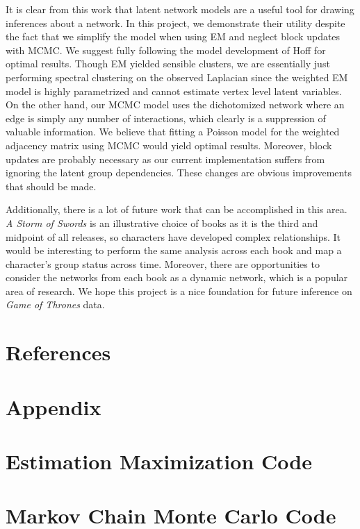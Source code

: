 \documentclass{article}
\begin{document}
It is clear from this work that latent network models are a useful tool for drawing inferences about a network. In this project, we demonstrate their utility despite the fact that we simplify the model when using EM and neglect block updates with MCMC. We suggest fully following the model development of Hoff for optimal results. Though EM yielded sensible clusters, we are essentially just performing spectral clustering on the observed Laplacian since the weighted EM model is highly parametrized and cannot estimate vertex level latent variables. On the other hand, our MCMC model uses the dichotomized network where an edge is simply any number of interactions, which clearly is a suppression of valuable information. We believe that fitting a Poisson model for the weighted adjacency matrix using MCMC would yield optimal results. Moreover, block updates are probably necessary as our current implementation suffers from ignoring the latent group dependencies. These changes are obvious improvements that should be made.

Additionally, there is a lot of future work that can be accomplished in this area. \textit{A Storm of Swords} is an illustrative choice of books as it is the third and midpoint of all releases, so characters have developed complex relationships. It would be interesting to perform the same analysis across each book and map a character's group status across time. Moreover, there are opportunities to consider the networks from each book as a dynamic network, which is a popular area of research. We hope this project is a nice foundation for future inference on \textit{Game of Thrones} data.

\section{References}
\printbibliography

\newpage
\section*{Appendix}
\appendix 
\section{Estimation Maximization Code}



\newpage
\section{Markov Chain Monte Carlo Code}


\end{document}
